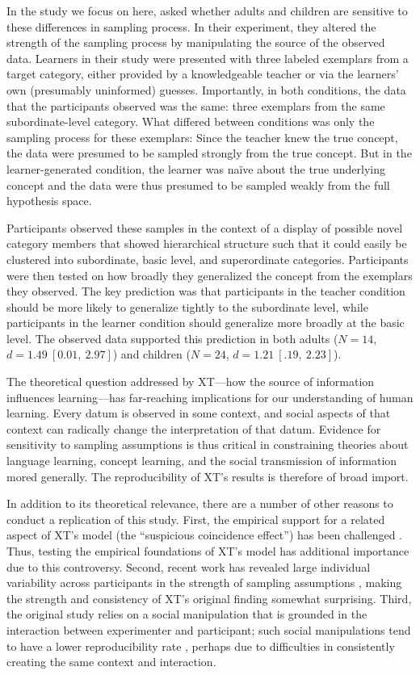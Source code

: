 \documentclass[man]{apa2}
\begin{document}
In the study we focus on here,  asked whether adults and children are sensitive to these differences in sampling process. In their experiment, they altered the strength of the sampling process by manipulating the source of the observed data. Learners in their study were presented with three labeled exemplars from a target category, either provided by a knowledgeable teacher or via the learners' own (presumably uninformed) guesses. Importantly, in both conditions, the data that the participants observed was the same: three exemplars from the same subordinate-level category. What differed between conditions was only the sampling process for these exemplars: Since the teacher knew the true concept, the data were presumed to be sampled strongly from the true concept. But in the learner-generated condition, the learner was na\"ive about the true underlying concept and the data were thus presumed to be sampled weakly from the full hypothesis space. 

Participants observed these samples in the context of a display of possible novel category members that showed hierarchical structure such that it could easily be clustered into subordinate, basic level, and superordinate categories. Participants were then tested on how broadly they generalized the concept from the exemplars they observed. The key prediction was that participants in the teacher condition should be more likely to generalize tightly to the subordinate level, while participants in the learner condition should generalize more broadly at the basic level. The observed data supported this prediction in both adults ($N=14$, $d = 1.49\ [0.01,\ 2.97]$) and children ($N=24$, $d = 1.21\ [.19,\ 2.23]$).

The theoretical question addressed by XT---how the source of information influences learning---has far-reaching implications for our understanding of human learning. Every datum is observed in some context, and social aspects of that context can radically change the interpretation of that datum. Evidence for sensitivity to sampling assumptions is thus critical in constraining theories about language learning, concept learning, and the social transmission of information mored generally. The reproducibility of XT's results is therefore of broad import. 

In addition to its theoretical relevance, there are a number of other reasons to conduct a replication of this study. First, the empirical support for a related aspect of XT's model (the ``suspicious coincidence effect'')  has been challenged \cite{jenkins2015non,spencer2011}. Thus, testing the empirical foundations of XT's model has additional importance due to this controversy. Second, recent work has revealed large individual variability across participants in the strength of sampling assumptions \cite{navarro2012sampling}, making the strength and consistency of XT's original finding somewhat surprising. Third, the original study relies on a social manipulation that is grounded in the interaction between experimenter and participant; such social manipulations tend to have a lower reproducibility rate \cite{reproProj2015}, perhaps due to difficulties in consistently creating the same context and interaction. 
\end{document}
